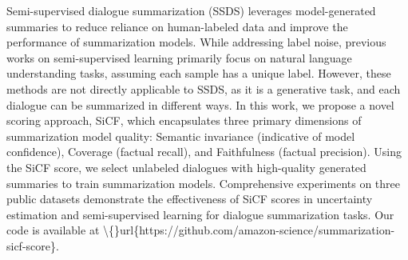 Semi-supervised dialogue summarization (SSDS) leverages model-generated summaries to reduce reliance on human-labeled data and improve the performance of summarization models. While addressing label noise, previous works on semi-supervised learning primarily focus on natural language understanding tasks, assuming each sample has a unique label. However, these methods are not directly applicable to SSDS, as it is a generative task, and each dialogue can be summarized in different ways. In this work, we propose a novel scoring approach, SiCF, which encapsulates three primary dimensions of summarization model quality: Semantic invariance (indicative of model confidence), Coverage (factual recall), and Faithfulness (factual precision). Using the SiCF score, we select unlabeled dialogues with high-quality generated summaries to train summarization models. Comprehensive experiments on three public datasets demonstrate the effectiveness of SiCF scores in uncertainty estimation and semi-supervised learning for dialogue summarization tasks. Our code is available at \textbackslash\{\}url\{https://github.com/amazon-science/summarization-sicf-score\}.